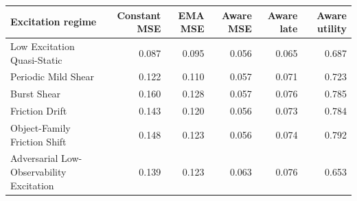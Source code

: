 \begin{tabular}{lrrrrr}
\toprule
Excitation regime & Constant MSE & EMA MSE & Aware MSE & Aware late & Aware utility \\
\midrule
Low Excitation Quasi-Static & 0.087 & 0.095 & 0.056 & 0.065 & 0.687 \\
Periodic Mild Shear & 0.122 & 0.110 & 0.057 & 0.071 & 0.723 \\
Burst Shear & 0.160 & 0.128 & 0.057 & 0.076 & 0.785 \\
Friction Drift & 0.143 & 0.120 & 0.056 & 0.073 & 0.784 \\
Object-Family Friction Shift & 0.148 & 0.123 & 0.056 & 0.074 & 0.792 \\
Adversarial Low-Observability Excitation & 0.139 & 0.123 & 0.063 & 0.076 & 0.653 \\
\bottomrule
\end{tabular}
